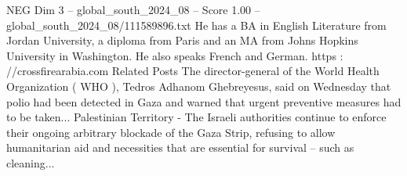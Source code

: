 \begin{textsample}{NEG Dim 3 – global\_south\_2024\_08 – Score 1.00 – global\_south\_2024\_08/111589896.txt}
He has a BA in English Literature from Jordan University, a diploma from Paris and an MA from Johns Hopkins University in Washington.
He also speaks French and German. https : //crossfirearabia.com Related Posts The director-general of the World Health Organization ( WHO ), Tedros Adhanom Ghebreyesus, said on Wednesday that polio had been detected in Gaza and warned that urgent preventive measures had to be taken...
Palestinian Territory - The Israeli authorities continue to enforce their ongoing arbitrary blockade of the Gaza Strip, refusing to allow humanitarian aid and necessities that are essential for survival -- such as cleaning...

\end{textsample}
